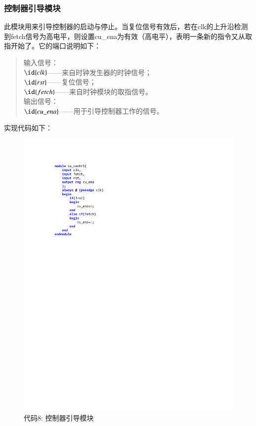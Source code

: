 \documentclass[titlepage, 11pt]{article}
\begin{document}
		\subsubsection{控制器引导模块}
			此模块用来引导控制器的启动与停止。当复位信号有效后，若在clk的上升沿检测到fetch信号为高电平，则设置cu\_ena为有效（高电平），表明一条新的指令又从取指开始了。它的端口说明如下：
			\begin{quote}
				输入信号：\\
				$\id{clk}$——来自时钟发生器的时钟信号；\\
				$\id{rst}$——复位信号；\\
				$\id{fetch}$——来自时钟模块的取指信号。\\
				输出信号：\\
				$\id{cu\_ena}$——用于引导控制器工作的信号。
			\end{quote}
			实现代码如下：
			\begin{figure}[H]
				\centering
				\includegraphics[scale=1]{28.pdf}
				\caption*{代码8: 控制器引导模块}
			\end{figure}
\end{document}
